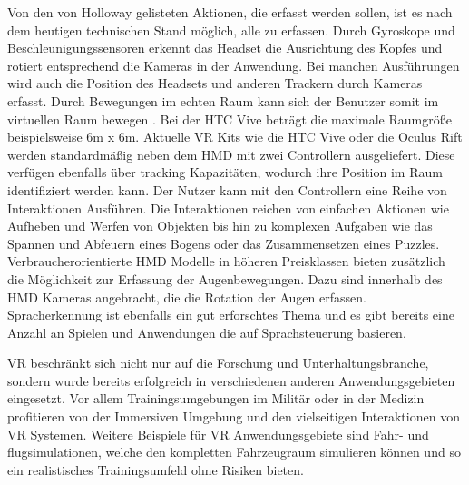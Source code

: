Von den von Holloway \cite{Holloway1995} gelisteten Aktionen, die erfasst werden sollen, ist es nach dem heutigen technischen Stand möglich, alle zu erfassen.
Durch Gyroskope und Beschleunigungssensoren erkennt das Headset die Ausrichtung des Kopfes und rotiert entsprechend die Kameras in der Anwendung. Bei manchen Ausführungen wird auch die Position des Headsets und anderen Trackern durch Kameras erfasst. Durch Bewegungen im echten Raum kann sich der Benutzer somit im virtuellen Raum bewegen \cite{Boas2012}\cite{Holloway1995}. Bei der HTC Vive beträgt die maximale Raumgröße beispielsweise 6m x 6m.
Aktuelle VR Kits wie die HTC Vive oder die Oculus Rift werden standardmäßig neben dem HMD mit zwei Controllern ausgeliefert. Diese verfügen ebenfalls über tracking Kapazitäten, wodurch ihre Position im Raum identifiziert werden kann. Der Nutzer kann mit den Controllern eine Reihe von Interaktionen Ausführen. Die Interaktionen reichen von einfachen Aktionen wie Aufheben und Werfen von Objekten bis hin zu komplexen Aufgaben wie das Spannen und Abfeuern eines Bogens oder das Zusammensetzen eines Puzzles. Verbraucherorientierte HMD Modelle in höheren Preisklassen bieten zusätzlich die Möglichkeit zur Erfassung der Augenbewegungen. Dazu sind innerhalb des HMD Kameras angebracht, die die Rotation der Augen erfassen. Spracherkennung ist ebenfalls ein gut erforschtes Thema und es gibt bereits eine Anzahl an Spielen und Anwendungen die auf Sprachsteuerung basieren. \cite{Lamberti2017} 

VR beschränkt sich nicht nur auf die Forschung und Unterhaltungsbranche, sondern wurde bereits erfolgreich in verschiedenen anderen Anwendungsgebieten eingesetzt. Vor allem Trainingsumgebungen im Militär oder in der Medizin profitieren von der Immersiven Umgebung und den vielseitigen Interaktionen von VR Systemen. Weitere Beispiele für VR Anwendungsgebiete sind Fahr- und flugsimulationen, welche den kompletten Fahrzeugraum simulieren können und so ein realistisches Trainingsumfeld ohne Risiken bieten.\cite{Ragan2010}
 


